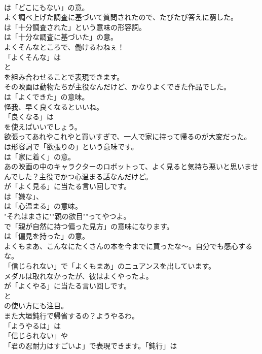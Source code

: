 \documentclass[8pt]{extreport}
\begin{document}
\begin{CJK}{UTF8}{min}
\\	は「どこにもない」の意。	
\\	よく調べ上げた調査に基づいて質問されたので、たびたび答えに窮した。 
\\	は「十分調査された」という意味の形容詞。
\\	は「十分な調査に基づいた」の意。	
\\	よくそんなところで、働けるわねぇ！ 
\\	「よくそんな」は
\\	と
\\	を組み合わせることで表現できます。	
\\	その映画は動物たちが主役なんだけど、かなりよくできた作品でした。 
\\	は「よくできた」の意味。	
\\	怪我、早く良くなるといいね。 
\\	「良くなる」は
\\	を使えばいいでしょう。	
\\	欲張ってあれやこれやと買いすぎで、一人で家に持って帰るのが大変だった。 
\\	は形容詞で「欲張りの」という意味です。
\\	は「家に着く」の意。	
\\	あの映画の中のキャラクターのロボットって、よく見ると気持ち悪いと思いませんでした？主役でかつ心温まる話なんだけど。 
\\	が「よく見る」に当たる言い回しです。
\\	は「嫌な」、
\\	は「心温まる」の意味。	
\\	"それはまさに""親の欲目""ってやつよ。 
\\	で「親が自然に持つ偏った見方」の意味になります。
\\	は「偏見を持った」の意。
\\	よくもまあ、こんなにたくさんの本を今までに買ったな～。自分でも感心するな。 
\\	「信じられない」で「よくもまあ」のニュアンスを出しています。	
\\	メダルは取れなかったが、彼はよくやったよ。 
\\	が「よくやる」に当たる言い回しです。
\\	と
\\	の使い方にも注目。	
\\	また大垣鈍行で帰省するの？ようやるわ。 
\\	「ようやるは」は
\\	「信じられない」や 
\\	「君の忍耐力はすごいよ」で表現できます。「鈍行」は

\end{CJK}
\end{document}

